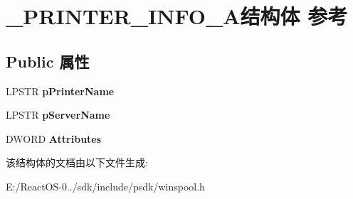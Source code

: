\hypertarget{struct___p_r_i_n_t_e_r___i_n_f_o__4_a}{}\section{\+\_\+\+P\+R\+I\+N\+T\+E\+R\+\_\+\+I\+N\+F\+O\+\_\+A结构体 参考}
\label{struct___p_r_i_n_t_e_r___i_n_f_o__4_a}
\subsection*{Public 属性}
\begin{DoxyCompactItemize}
\item 
\mbox{\label{struct___p_r_i_n_t_e_r___i_n_f_o__4_a_a9d09b3bd1378bc442586702b201f13c8}} 
L\+P\+S\+TR {\bfseries p\+Printer\+Name}
\item 
\mbox{\label{struct___p_r_i_n_t_e_r___i_n_f_o__4_a_aa907a8279e016323fc024b59c776131f}} 
L\+P\+S\+TR {\bfseries p\+Server\+Name}
\item 
\mbox{\label{struct___p_r_i_n_t_e_r___i_n_f_o__4_a_a0ac7bd6d53ef4bb0fa958e07020aa9e0}} 
D\+W\+O\+RD {\bfseries Attributes}
\end{DoxyCompactItemize}


该结构体的文档由以下文件生成\+:\begin{DoxyCompactItemize}
\item 
E\+:/\+React\+O\+S-\/0../sdk/include/psdk/winspool.\+h\end{DoxyCompactItemize}
